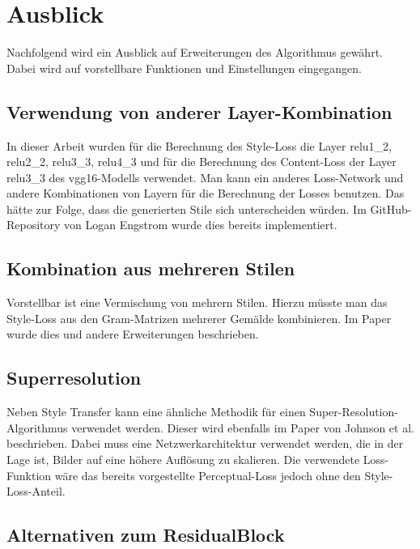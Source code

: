 \section{Ausblick}

Nachfolgend wird ein Ausblick auf Erweiterungen des Algorithmus gewährt. Dabei wird auf vorstellbare Funktionen und Einstellungen eingegangen.

\subsection{Verwendung von anderer Layer-Kombination}

In dieser Arbeit wurden für die Berechnung des Style-Loss die Layer relu1\_2, relu2\_2, relu3\_3, relu4\_3 und für die Berechnung des Content-Loss der Layer relu3\_3 des \gls{vgg16}-Modells verwendet. Man kann ein anderes Loss-Network und andere Kombinationen von Layern für die Berechnung der Losses benutzen. Das hätte zur Folge, dass die generierten Stile sich unterscheiden würden. Im GitHub-Repository von Logan Engstrom  \cite{engstrom2016faststyletransfer} wurde dies bereits implementiert.

\subsection{Kombination aus mehreren Stilen}
\label{sec:combination_many_styles}

Vorstellbar ist eine Vermischung von mehrern Stilen. Hierzu müsste man das Style-Loss aus den Gram-Matrizen mehrerer Gemälde kombinieren. Im Paper \cite{stanfordStyleTransfer} wurde dies und andere Erweiterungen beschrieben.

\subsection{Superresolution}
\label{sec:superresolution}

Neben Style Transfer kann eine ähnliche Methodik für einen Super-Resolution-Algorithmus verwendet werden. Dieser wird ebenfalls im Paper von Johnson et al. \cite{DBLP:journals/corr/JohnsonAL16} beschrieben. Dabei muss eine Netzwerkarchitektur verwendet werden, die in der Lage ist, Bilder auf eine höhere Auflösung zu skalieren. Die verwendete Loss-Funktion wäre das bereits vorgestellte Perceptual-Loss jedoch ohne den Style-Loss-Anteil.

\subsection{Alternativen zum ResidualBlock}
\label{sec:alternatives_to_residual_block}


